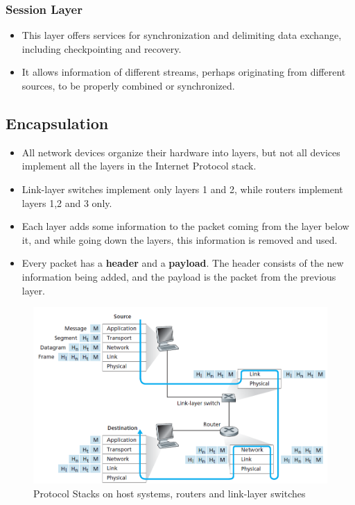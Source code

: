 \documentclass{article}
\theoremstyle{plain}
\theoremstyle{definition}
\begin{document}
\subsubsection{Session Layer}
\begin{itemize}
    \item This layer offers services for synchronization and delimiting data exchange, including checkpointing and recovery. 
    
    \item It allows information of different streams, perhaps originating from different sources, to be properly combined or synchronized.
\end{itemize}
\subsection{Encapsulation}
\begin{itemize}
    \item All network devices organize their hardware into layers, but not all devices implement all the layers in the Internet Protocol stack.
    
    \item Link-layer switches implement only layers 1 and 2, while routers implement layers 1,2 and 3 only. 
    
    \item Each layer adds some information to the packet coming from the layer below it, and while going down the layers, this information is removed and used.
    
    \item Every packet has a \textbf{header} and a \textbf{payload}. The header consists of the new information being added, and the payload is the packet from the previous layer. 
\end{itemize}
\begin{figure}[ht]
    \centering
    \includegraphics[scale=0.65]{cn12.png}
    \caption{Protocol Stacks on host systems, routers and link-layer switches}
    \label{fig:my_label_12}
\end{figure}
\end{document}
